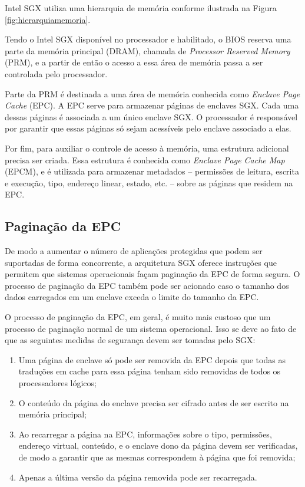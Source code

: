 Intel SGX utiliza uma hierarquia de memória conforme ilustrada na Figura
\ref{fig:hierarquiamemoria}.

Tendo o Intel SGX disponível no processador e habilitado, o BIOS reserva uma
parte da memória principal (DRAM), chamada de \textit{Processor Reserved Memory}
(PRM), e a partir de então o acesso a essa área de memória passa a ser
controlada pelo processador.

Parte da PRM é destinada a uma área de memória conhecida como \textit{Enclave
Page Cache} (EPC). A EPC serve para armazenar páginas de enclaves SGX.
Cada uma dessas páginas é associada a um único enclave SGX. O processador é
responsável por garantir que essas páginas só sejam acessíveis pelo enclave
associado a elas.

Por fim, para auxiliar o controle de acesso à memória, uma estrutura adicional
precisa ser criada. Essa estrutura é conhecida como \textit{Enclave Page Cache
Map} (EPCM), e é utilizada para armazenar metadados -- permissões de leitura,
escrita e execução, tipo, endereço linear, estado, etc. -- sobre as páginas que
residem na EPC.

\subsection{Paginação da EPC}
\label{subsec:sgx_modelo_memoria_paginacao_epc}
De modo a aumentar o número de aplicações protegidas que podem ser suportadas de
forma concorrente, a arquitetura SGX oferece instruções que permitem que
sistemas operacionais façam paginação da EPC de forma segura. O processo de
paginação da EPC também pode ser acionado caso o tamanho dos dados carregados em
um enclave exceda o limite do tamanho da EPC.

O processo de paginação da EPC, em geral, é muito mais custoso que um processo
de paginação normal de um sistema operacional. Isso se deve ao fato de que as
seguintes medidas de segurança devem ser tomadas pelo SGX:

\begin{enumerate}
    \item Uma página de enclave só pode ser removida da EPC depois que todas as
    traduções em cache para essa página tenham sido removidas de todos os
    processadores lógicos;

    \item O conteúdo da página do enclave precisa ser cifrado antes de ser
    escrito na memória principal;

    \item Ao recarregar a página na EPC, informações sobre o tipo, permissões,
    endereço virtual, conteúdo, e o enclave dono da página devem ser
    verificadas, de modo a garantir que as mesmas correspondem à página que foi
    removida;

    \item Apenas a última versão da página removida pode ser recarregada.
\end{enumerate}

